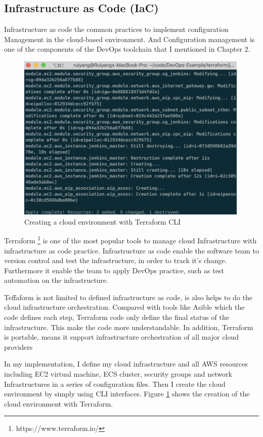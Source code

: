 \subsection{Infrastructure as Code (IaC)}
Infrastructure as code the common practices to implement configuration Management in the cloud-based environment. And Configuration management is one of the components of the DevOps toolchain that I mentioned in Chapter 2.
\begin{figure}[h]
\centering
\includegraphics[width=0.99\textwidth]{pics/terraform.png}
\caption{Creating a cloud environment with Terraform CLI}
\label{fig:terraform}
\end{figure}
\par
Terraform \footnote{https://www.terraform.io/} is one of the most popular tools to manage cloud Infrastructure with infrastructure as code practice. Infrastructure as code enable the software team to version control and test the infrastructure, in order to track it's change. Furthermore it enable the team to apply DevOps practice, such as test automation on the infrastructure.

Teffaform is not limited to defined infrastructure as code, is also helps to do the cloud infrastructure orchestration. Compared with tools like Asible which the code defines each step, Terraform code only define the final status of the infrastructure. This make the code more understandable. In addition, Terraform is portable, means it support infrastructure orchestration of all major cloud providers

In my implementation, I define my cloud infrastructure and all AWS resources including EC2 virtual machine, ECS cluster, security groups and network Infrastructures in a series of configuration files. Then I create the cloud environment by simply using CLI interfaces. Figure \ref{fig:terraform} shows the creation of the cloud environment with Terraform.
